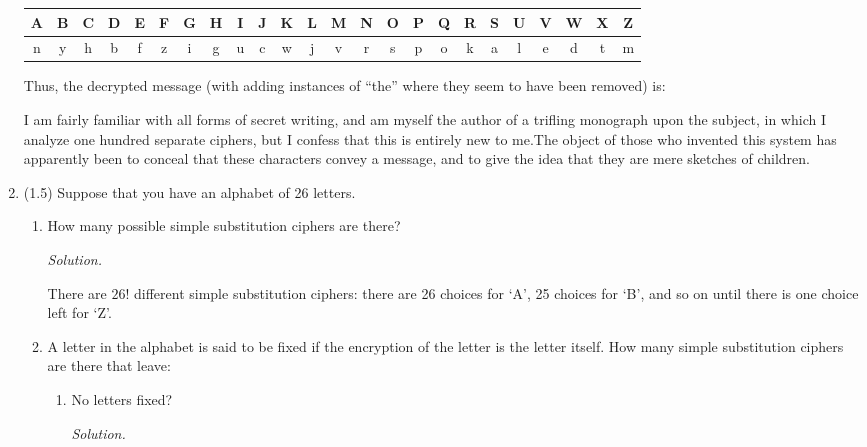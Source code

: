 \documentclass[12pt]{amsart}
\theoremstyle{definition}
\begin{document}
\begin{enumerate}
	\begin{center}
		\begin{tabular}{|c |c |c |c |c |c |c |c |c |c |c |c |c |c |c |c |c |c |c |c |c |c |c |c|}
			\hline
			A & B & C & D & E & F & G & H & I & J & K & L & M & N & O & 
			P & Q & R & S & U & V & W & X & Z \\
			\hline
			n & y & h & b & f & z & i & g & u & c & w & j & v & r & s & 
			p & o & k & a & l & e & d & t & m \\
			\hline 
		\end{tabular}
	\end{center}

	Thus, the decrypted message (with adding instances of ``the'' where they seem to have been removed) is:

	\begin{center}
		\ttfamily
		I am fairly familiar with all forms of secret writing, and am myself the author of a trifling monograph upon the subject, in which I analyze one hundred separate ciphers, but I confess that this is entirely new to me.\;The object of those who invented this system has apparently been to conceal that these characters convey a message, and to give the idea that they are mere sketches of children.
	\end{center}


	\bigskip
	\item (1.5) Suppose that you have an alphabet of 26 letters.
		\begin{enumerate}
			\item  How many possible simple substitution ciphers are there?
			
			\medskip
			\textit{Solution.}

			There are $26!$ different simple substitution ciphers: there are 26 choices for `A', 25 choices for `B', and so on until there is one choice left for `Z'.
			\item  A letter in the alphabet is said to be fixed if the encryption of the letter is the
				letter itself. How many simple substitution ciphers are there that leave:
			\begin{enumerate}
				\item No letters fixed?
				
				\medskip
				\textit{Solution.}
			

\end{enumerate}
\end{enumerate}
\end{enumerate}
\end{document}
